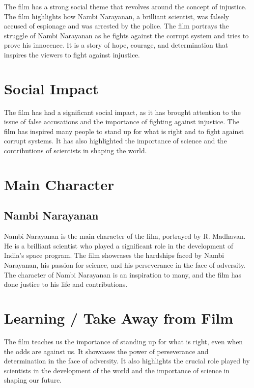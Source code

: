 \documentclass[11pt]{article}
\begin{document}
The film has a strong social theme that revolves around the concept of injustice. The film highlights how Nambi Narayanan, a brilliant scientist, was falsely accused of espionage and was arrested by the police. The film portrays the struggle of Nambi Narayanan as he fights against the corrupt system and tries to prove his innocence. It is a story of hope, courage, and determination that inspires the viewers to fight against injustice.

\section{Social Impact}

The film has had a significant social impact, as it has brought attention to the issue of false accusations and the importance of fighting against injustice. The film has inspired many people to stand up for what is right and to fight against corrupt systems. It has also highlighted the importance of science and the contributions of scientists in shaping the world.


\section{Main Character}

\subsection*{Nambi Narayanan}

Nambi Narayanan is the main character of the film, portrayed by R. Madhavan. He is a brilliant scientist who played a significant role in the development of India's space program. The film showcases the hardships faced by Nambi Narayanan, his passion for science, and his perseverance in the face of adversity. The character of Nambi Narayanan is an inspiration to many, and the film has done justice to his life and contributions.

\section{Learning / Take Away from Film}

The film teaches us the importance of standing up for what is right, even when the odds are against us. It showcases the power of perseverance and determination in the face of adversity. It also highlights the crucial role played by scientists in the development of the world and the importance of science in shaping our future.
\end{document}
